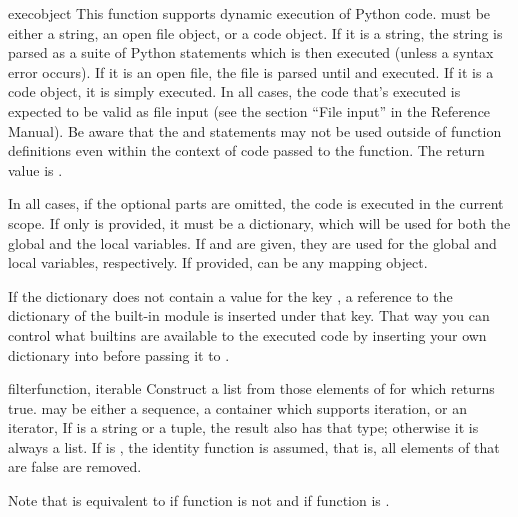 \begin{funcdesc}{exec}{object}
  This function supports dynamic execution of Python code.
   must be either a string, an open file object, or
  a code object.  If it is a string, the string is parsed as a suite of
  Python statements which is then executed (unless a syntax error
  occurs).  If it is an open file, the file is parsed until \EOF{} and
  executed.  If it is a code object, it is simply executed.  In all
  cases, the code that's executed is expected to be valid as file
  input (see the section ``File input'' in the Reference Manual).
  Be aware that the  and  statements may
  not be used outside of function definitions even within the context of
  code passed to the  function.
  The return value is .

  In all cases, if the optional parts are omitted, the code is executed
  in the current scope.  If only  is provided, it must be
  a dictionary, which will be used for both the global and the local
  variables.  If  and  are given, they are used
  for the global and local variables, respectively.  If provided,
   can be any mapping object.

  If the  dictionary does not contain a value for the
  key , a reference to the dictionary of the built-in
  module  is inserted under that key.  That way you
  can control what builtins are available to the executed code by
  inserting your own  dictionary into 
  before passing it to .

\end{funcdesc}

\begin{funcdesc}{filter}{function, iterable}
  Construct a list from those elements of  for which
   returns true.   may be either a sequence, a
  container which supports iteration, or an iterator,  If 
  is a string or a tuple, the result
  also has that type; otherwise it is always a list.  If  is
  , the identity function is assumed, that is, all elements of
   that are false are removed.

  Note that  is equivalent to
   if function is
  not  and  if
  function is .
\end{funcdesc}

